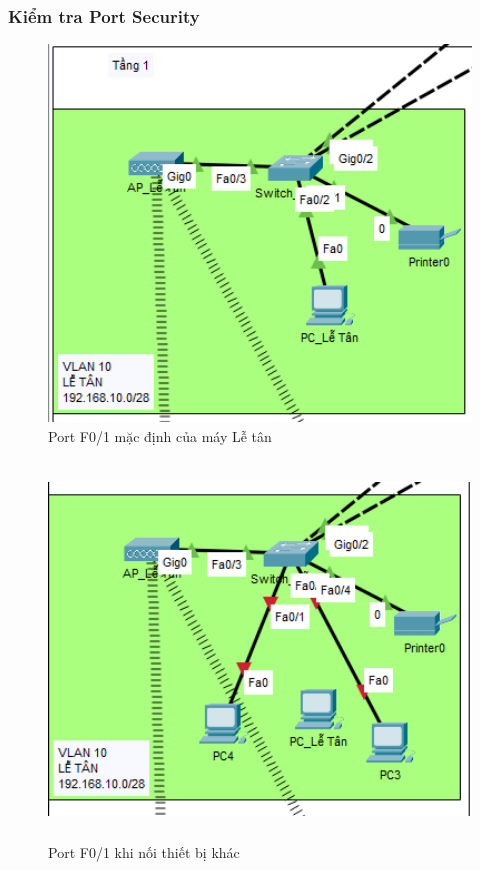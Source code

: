 \documentclass[a4paper, 12pt]{article}
\begin{document}
\subsubsection{Kiểm tra Port Security}
\begin{figure}[H]
    \centering
    \includegraphics[width=16cm, height=10cm]{img/po1.png}
    \caption{Port F0/1 mặc định của máy Lễ tân}
    \label{hinhstp1}
\end{figure}

\begin{figure}[H]
    \centering
    \includegraphics[width=16cm, height=10cm]{img/po2.png}
    \caption{Port F0/1 khi nối thiết bị khác}
    \label{hinhstp2}
\end{figure}
\end{document}
